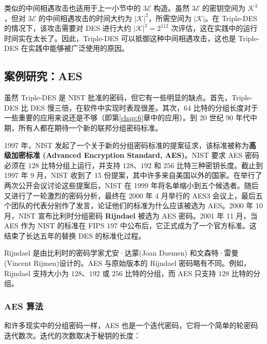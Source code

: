 \begin{snote}
类似的中间相遇攻击也适用于上一小节中的 $3\mathcal{E}$ 构造。虽然 $3\mathcal{E}$ 的密钥空间为 $\mathcal{K}^3$，但对 $3\mathcal{E}$ 的中间相遇攻击的时间大约为 $|\mathcal{K}|^2$，所需空间为 $|\mathcal{K}|$。在 Triple-DES 的情况下，该攻击需要对 DES 进行大约 $|\mathcal{K}|^2=2^{112}$ 次评估，这在实践中的运行时间实在太长了。因此，Triple-DES 可以抵御这种中间相遇攻击，这也是 Triple-DES 在实践中能够被广泛使用的原因。
\end{snote}

\subsection{案例研究：AES}

虽然 Triple-DES 是 NIST 批准的密码，但它有一些明显的缺点。首先，Triple-DES 比 DES 慢三倍，在软件中实现时表现很差。其次，$64$ 比特的分组长度对于一些重要的应用来说还是不够（即第\ref{chap:6}章中的应用）。到 20 世纪 90 年代中期，所有人都在期待一个新的联邦分组密码标准。

\begin{snote}[AES的历程。]
1997 年，NIST 发起了一个关于新的分组密码标准的提案征求，该标准被称为\textbf{高级加密标准 (Advanced Encryption Standard, AES)}。NIST 要求 AES 密码必须在 $128$ 比特分组上运行，并支持 $128$、$192$ 和 $256$ 比特三种密钥长度。截止到 1997 年 9 月，NIST 收到了 15 份提案，其中许多来自美国以外的国家。在举行了两次公开会议讨论这些提案后，NIST 在 1999 年将名单缩小到五个候选者。随后又进行了一轮激烈的密码分析，最终在 2000 年 4 月举行的 AES3 会议上，最后五个团队的代表分别作了发言，论证他们的标准为什么应该被选为 AES。2000 年 10 月，NIST 宣布比利时分组密码 \textbf{Rijndael} 被选为 AES 密码。2001 年 11 月，当 AES 作为 NIST 的标准在 FIPS 197 中公布后，它正式成为了一个官方标准。这结束了长达五年的替换 DES 的标准化过程。

Rijndael 是由比利时的密码学家尤安·达蒙(Joan Daemen) 和文森特·雷曼(Vincent Rijmen)设计的。AES 与原始版本的 Rijndael 密码略有不同。例如，Rijndael 支持大小为 $128$、$192$ 或 $256$ 比特的分组，而 AES 只支持 $128$ 比特的分组。
\end{snote}

\subsubsection{AES 算法}

和许多现实中的分组密码一样，AES 也是一个迭代密码，它将一个简单的轮密码迭代数次。迭代的次数取决于秘钥的长度：


